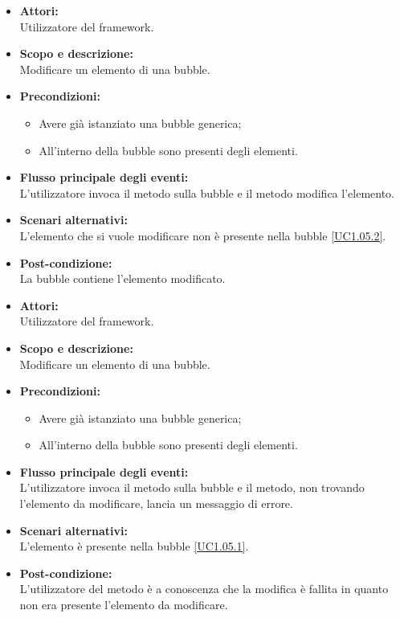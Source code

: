 \begin{itemize}
	\item \textbf{Attori:}
	\\Utilizzatore del framework.
	\item \textbf{Scopo e descrizione:} 
	\\Modificare un elemento di una bubble.
	\item \textbf{Precondizioni:}
	\begin{itemize}
		\item Avere già istanziato una bubble generica;
		\item All'interno della bubble sono presenti degli elementi.
	\end{itemize}
	\item \textbf{Flusso principale degli eventi:}
	\\L'utilizzatore invoca il metodo sulla bubble e il metodo modifica l'elemento.
	\item \textbf{Scenari alternativi:}
	\\L'elemento che si vuole modificare non è presente nella bubble \ref{UC1.05.2}.
	\item \textbf{Post-condizione:}
	\\La bubble contiene l'elemento modificato.
\end{itemize}


\begin{itemize}
	\item \textbf{Attori:}
	\\Utilizzatore del framework.
	\item \textbf{Scopo e descrizione:} 
	\\Modificare un elemento di una bubble.
	\item \textbf{Precondizioni:}
	\begin{itemize}
		\item Avere già istanziato una bubble generica;
		\item All'interno della bubble sono presenti degli elementi.
	\end{itemize}
	\item \textbf{Flusso principale degli eventi:}
	\\L'utilizzatore invoca il metodo sulla bubble e il metodo, non trovando l'elemento da modificare, lancia un messaggio di errore.
	\item \textbf{Scenari alternativi:}
	\\L'elemento è presente nella bubble \ref{UC1.05.1}.
	\item \textbf{Post-condizione:}
	\\L'utilizzatore del metodo è a conoscenza che la modifica è fallita in quanto non era presente l'elemento da modificare.
\end{itemize}

